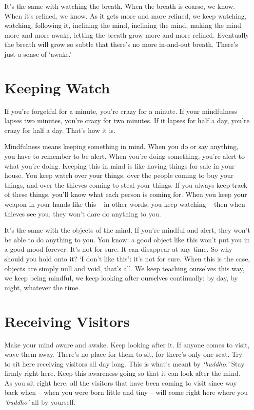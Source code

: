 It's the same with watching the breath. When the breath is coarse, we know. When it's refined, we know. As it gets more and more refined, we keep watching, watching, following it, inclining the mind, inclining the mind, making the mind more and more awake, letting the breath grow more and more refined. Eventually the breath will grow so subtle that there's no more in-and-out breath. There's just a sense of `awake.'

\clearpage

\section{Keeping Watch}

If you're forgetful for a minute, you're crazy for a minute. If your mindfulness lapses two minutes, you're crazy for two minutes. If it lapses for half a day, you're crazy for half a day. That's how it is.

Mindfulness means keeping something in mind. When you do or say anything, you have to remember to be alert. When you're doing something, you're alert to what you're doing. Keeping this in mind is like having things for sale in your house. You keep watch over your things, over the people coming to buy your things, and over the thieves coming to steal your things. If you always keep track of these things, you'll know what each person is coming for. When you keep your weapon in your hands like this -- in other words, you keep watching -- then when thieves see you, they won't dare do anything to you.

It's the same with the objects of the mind. If you're mindful and alert, they won't be able to do anything to you. You know: a good object like this won't put you in a good mood forever. It's not for sure. It can disappear at any time. So why should you hold onto it? `I don't like this': it's not for sure. When this is the case, objects are simply null and void, that's all. We keep teaching ourselves this way, we keep being mindful, we keep looking after ourselves continually: by day, by night, whatever the time. 

\clearpage

\section{Receiving Visitors}

Make your mind aware and awake. Keep looking after it. If anyone comes to visit, wave them away. There's no place for them to sit, for there's only one seat. Try to sit here receiving visitors all day long. This is what's meant by \textit{`buddho.'} Stay firmly right here. Keep this awareness going so that it can look after the mind. As you sit right here, all the visitors that have been coming to visit since way back when -- when you were born little and tiny -- will come right here where you \textit{`buddho'} all by yourself.

